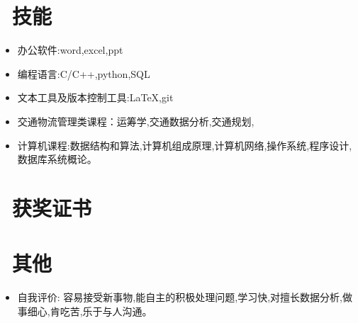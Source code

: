 \documentclass{resume}
\begin{document}

\section{\faCogs\ 技能}
\begin{itemize}[parsep=0.5ex]
  \item 办公软件:word,excel,ppt
  \item 编程语言:C/C++,python,SQL
  \item 文本工具及版本控制工具:LaTeX,git
  \item 交通物流管理类课程：运筹学,交通数据分析,交通规划,
  \item 计算机课程:数据结构和算法,计算机组成原理,计算机网络,操作系统,程序设计,数据库系统概论。
\end{itemize}

\section{\faHeartO\ 获奖证书}

\section{\faInfo\ 其他}
\begin{itemize}[parsep=0.5ex]
  \item 自我评价: 容易接受新事物,能自主的积极处理问题,学习快,对擅长数据分析,做事细心,肯吃苦,乐于与人沟通。
\end{itemize}

%
%
\end{document}
